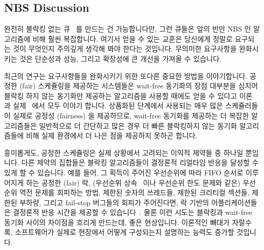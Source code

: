 \subsection{NBS Discussion}
\label{sec:advsync:NBS Discussion}

완전히 블락킹 없는 큐~\cite{MichaelScott96} 를 만드는 건 가능합니다만, 그런
큐들은 앞의 반만 NBS 인 알고리즘에 비해 훨씬 복잡합니다.
여기서 얻을 수 있는 교훈은 당신에게 정말로 요구되는 것이 무엇인지 주의깊게
생각해 봐야 한다는 것입니다.
무의미한 요구사항을 완화시키는 것은 단순성과 성능, 그리고 확장성에 큰 개선을
가져올 수 있습니다.

최근의 연구는 요구사항들을 완화시키기 위한 또다른 중요한 방법을 이야기합니다.
공정한 (fair) 스케쥴링을 제공하는 시스템들은 wait-free 동기화의 장점 대부분을
심지어 블락킹 하지 않는 동기화만 제공하는 알고리즘을 사용할 때에도 얻을 수
있다고 이론~\cite{DanAlitarh2013PracticalProgress} 과
실제~\cite{SamyAlBahra2013NBS} 에서 모두 이야기 합니다.
상품화된 단계에서 사용되는 매우 많은 스케쥴러들이 실제로 공정성 (fairness) 을
제공하므로, wait-free 동기화를 제공하는 더 복잡한 알고리즘들은 일반적으로 더
간단하고 많은 경우 더 빠른 블락킹하지 않는 동기화 알고리즘들에 비해 실제
환경에서 더 나은 점을 제공하지 못하곤 합니다.
\iffalse

It is possible to create fully non-blocking queues~\cite{MichaelScott96},
however, such queues are much more complex than the half-NBS algorithm
outlined above.
The lesson here is to carefully consider your actual requirements.
Relaxing irrelevant requirements can often result in great
improvements in simplicity, performance, and scalability.

Recent research points to another important way to relax requirements.
It turns out that systems providing fair scheduling can enjoy most
of the benefits of wait-free synchronization even when running
algorithms that provide only non-blocking
synchronization, both in theory~\cite{DanAlitarh2013PracticalProgress}
and in practice~\cite{SamyAlBahra2013NBS}.
Because a great many schedulers used in production do in fact
provide fairness,
the more-complex algorithms providing wait-free synchronization
usually provide no practical advantages over their simpler
and often faster non-blocking-synchronization counterparts.
\fi

흥미롭게도, 공정한 스케쥴링은 실제 상황에서 고려되는 이익적 제약들 중 하나일
뿐입니다.
다른 제약의 집합들은 블락킹 알고리즘들이 결정론적 리얼타임 반응을 달성할 수
있게 할 수 있습니다.
예를 들어, 그 획득이 주어진 우선순위에 따라 FIFO 순서로 이루어지게 하는 공정한
(fair) 락, (우선순위
상속~\cite{Takada:1995:RSN:527074.828566,Cai-DongWang1996PrioInherLock} 이나
우선순위 한도 문제와 같은) 우선순위 역전 문제를 회피하는 방법, 제한된 숫자의
쓰레드들, 제한된 크리티컬 섹션들, 제한된 부하량, 그리고 fail-stop 버그들의
회피가 주어진다면, 락 기반의 어플리케이션들은 결정론적 반응 시간을 제공할 수
있습니다~\cite{BjoernBrandenburgPhD,DipankarSarma2004OLSscalability}.
물론 이런 시도는 블락킹과 wait-free 동기화 사이의 차이점을 흐리게 만드는데,
좋은 현상입니다.
이론적인 뼈대가 자랄수록, 소프트웨어가 실제로 현장에서 어떻게 구성되는지
설명하는 능력도 증가할 것입니다.
\iffalse

